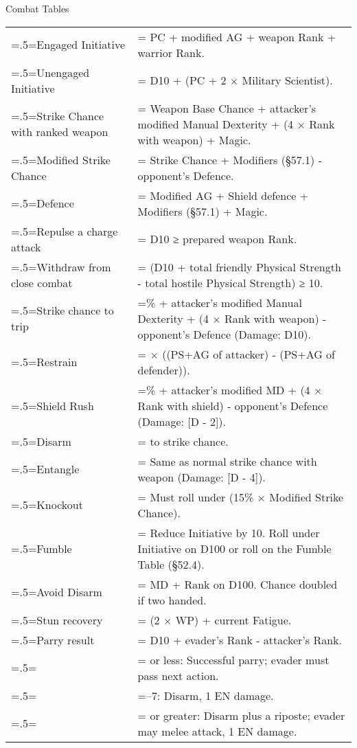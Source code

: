 \begin{Tables}{Combat Tables}
\begin{multicols}{3}
\begin{tabularx}{\columnwidth}{>{\hsize=.5\hsize\linewidth=\hsize}X>{\hsize=1.5\hsize\linewidth=\hsize}X}
Engaged Initiative			& PC + modified AG + weapon Rank + warrior Rank. \\
Unengaged Initiative			& D10 + (PC + 2 × Military Scientist). \\
Strike Chance with ranked weapon	& Weapon Base Chance + attacker’s modified Manual Dexterity + (4 × Rank with weapon) + Magic. \\
Modified Strike Chance			& Strike Chance + Modifiers (§57.1) - opponent’s Defence. \\
Defence					& Modified AG + Shield defence + Modifiers (§57.1) + Magic. \\
Repulse a charge attack			& D10 ≥ prepared weapon Rank.\\
Withdraw from close combat		& (D10 + total friendly Physical Strength - total hostile Physical Strength) ≥ 10. \\
Strike chance to trip			& 40\% + attacker’s modified Manual Dexterity + (4 × Rank with weapon) - opponent’s Defence (Damage: D10). \\
Restrain				& 3 × ((PS+AG of attacker) - (PS+AG of defender)). \\
Shield Rush				& 40\% + attacker’s modified MD + (4 × Rank with shield) - opponent’s Defence (Damage: [D - 2]). \\
Disarm					& -20 to strike chance. \\
Entangle				& Same as normal strike chance with weapon (Damage: [D - 4]). \\
Knockout				& Must roll under (15\% × Modified Strike Chance). \\
Fumble					& Reduce Initiative by 10. Roll under Initiative on D100 or roll on the Fumble Table (§52.4). \\
Avoid Disarm				& MD + Rank on D100. Chance doubled if two handed.\\
Stun recovery				& (2 × WP) + current Fatigue. \\
Parry result				& D10 + evader’s Rank - attacker’s Rank. \\
					& 3 or less: Successful parry; evader must pass next action. \\
					& 4–7: Disarm, 1 EN damage. \\
					& 8 or greater: Disarm plus a riposte; evader may melee attack, 1 EN damage. \\
\end{tabularx}


\end{multicols}
\end{Tables}
